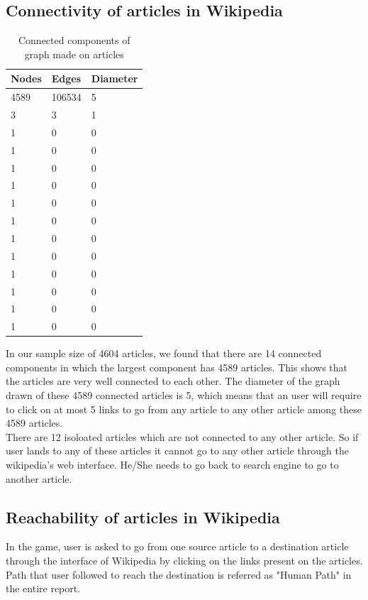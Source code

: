 \documentclass[12pt]{article}
\begin{document}
	\subsection{Connectivity of articles in Wikipedia}
	\begin{table}[h]
	\centering
	\begin{tabular}{|l|l|l|}
	\hline
	Nodes & Edges  & Diameter \\ \hline
	4589  & 106534 & 5        \\ \hline
	3     & 3      & 1        \\ \hline
	1     & 0      & 0        \\ \hline
	1     & 0      & 0        \\ \hline
	1     & 0      & 0        \\ \hline
	1     & 0      & 0        \\ \hline
	1     & 0      & 0        \\ \hline
	1     & 0      & 0        \\ \hline
	1     & 0      & 0        \\ \hline
	1     & 0      & 0        \\ \hline
	1     & 0      & 0        \\ \hline
	1     & 0      & 0        \\ \hline
	1     & 0      & 0        \\ \hline
	1     & 0      & 0        \\ \hline
	\end{tabular}
	\caption{Connected components of graph made on articles}
	\end{table}
	In our sample size of 4604 articles, we found that there are 14 connected components in which the largest component has 4589 articles. This shows that the articles are very well connected to each other. The diameter of the graph drawn of these 4589 connected articles is 5, which means that an user will require to click on at most 5 links to go from any article to any other article among these 4589 articles.\\
	
	There are 12 isoloated articles which are not connected to any other article. So if user lands to any of these articles it cannot go to any other article through the wikipedia's web interface. He/She needs to go back to search engine to go to another article. 
	
	\subsection{Reachability of articles in Wikipedia}
	In the game, user is asked to go from one source article to a destination article through the interface of Wikipedia by clicking on the links present on the articles. Path that user followed to reach the destination is referred as "Human Path" in the entire report.\\
	
\end{document}
